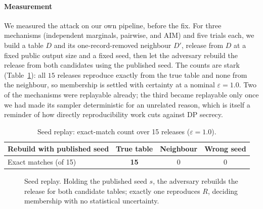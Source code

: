 \documentclass[conference]{IEEEtran}
\newcommand{\eps}{\varepsilon}
\begin{document}
\paragraph{Measurement} We measured the attack on our own pipeline, before the fix. For three
mechanisms (independent marginals, pairwise, and AIM) and five trials each, we build a table $D$ and
its one-record-removed neighbour $D'$, release from $D$ at a fixed public output size and a fixed seed,
then let the adversary rebuild the release from both candidates using the published seed. The counts
are stark (Table~\ref{tab:replay}): all $15$ releases reproduce exactly from the true table and none
from the neighbour, so membership is settled with certainty at a nominal $\eps{=}1.0$. Two of the
mechanisms were replayable already; the third became replayable only once we had made its sampler
deterministic for an unrelated reason, which is itself a reminder of how directly reproducibility work
cuts against DP secrecy.

\begin{table}[t]
\caption{Seed replay: exact-match count over 15 releases ($\eps{=}1.0$).}
\label{tab:replay}
\centering
\begin{tabular}{lccc}
\toprule
Rebuild with published seed & True table & Neighbour & Wrong seed \\
\midrule
Exact matches (of 15) & \textbf{15} & 0 & 0 \\
\bottomrule
\end{tabular}
\end{table}

\begin{figure}[t]
\centering
{}
\caption{Seed replay. Holding the published seed $s$, the adversary rebuilds the release for both
candidate tables; exactly one reproduces $R$, deciding membership with no statistical uncertainty.}
\label{fig:replay}
\end{figure}
\end{document}
